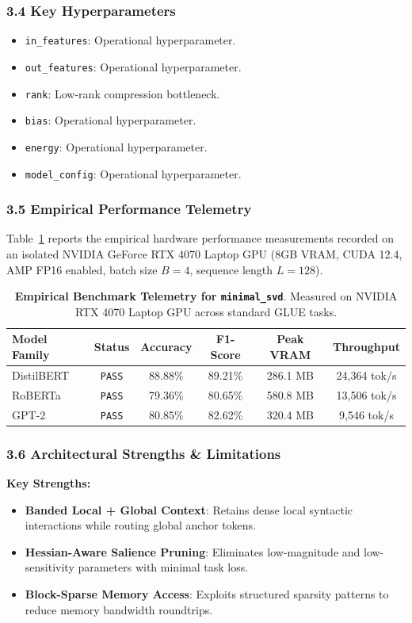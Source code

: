\subsubsection*{3.4 Key Hyperparameters}
\begin{itemize}
    \item \texttt{in\_features}: Operational hyperparameter.
    \item \texttt{out\_features}: Operational hyperparameter.
    \item \texttt{rank}: Low-rank compression bottleneck.
    \item \texttt{bias}: Operational hyperparameter.
    \item \texttt{energy}: Operational hyperparameter.
    \item \texttt{model\_config}: Operational hyperparameter.
\end{itemize}

\subsubsection*{3.5 Empirical Performance Telemetry}
Table~\ref{tab:telemetry_minimal_svd} reports the empirical hardware performance measurements recorded on an isolated NVIDIA GeForce RTX 4070 Laptop GPU (8GB VRAM, CUDA 12.4, AMP FP16 enabled, batch size $B=4$, sequence length $L=128$).

\begin{table}[h]
\centering
\small
\caption{\textbf{Empirical Benchmark Telemetry for \texttt{minimal\_svd}}. Measured on NVIDIA RTX 4070 Laptop GPU across standard GLUE tasks.}
\label{tab:telemetry_minimal_svd}
\begin{tabular*}{\columnwidth}{@{\extracolsep{\fill}}lccccc}
\toprule
\textbf{Model Family} & \textbf{Status} & \textbf{Accuracy} & \textbf{F1-Score} & \textbf{Peak VRAM} & \textbf{Throughput} \\
\midrule
DistilBERT & \texttt{PASS} & 88.88\% & 89.21\% & 286.1 MB & 24,364 tok/s \\
RoBERTa & \texttt{PASS} & 79.36\% & 80.65\% & 580.8 MB & 13,506 tok/s \\
GPT-2 & \texttt{PASS} & 80.85\% & 82.62\% & 320.4 MB & 9,546 tok/s \\
\bottomrule
\end{tabular*}
\end{table}

\subsubsection*{3.6 Architectural Strengths \& Limitations}
\textbf{Key Strengths:}
\begin{itemize}
    \item \textbf{Banded Local + Global Context}: Retains dense local syntactic interactions while routing global anchor tokens.
    \item \textbf{Hessian-Aware Salience Pruning}: Eliminates low-magnitude and low-sensitivity parameters with minimal task loss.
    \item \textbf{Block-Sparse Memory Access}: Exploits structured sparsity patterns to reduce memory bandwidth roundtrips.
\end{itemize}

